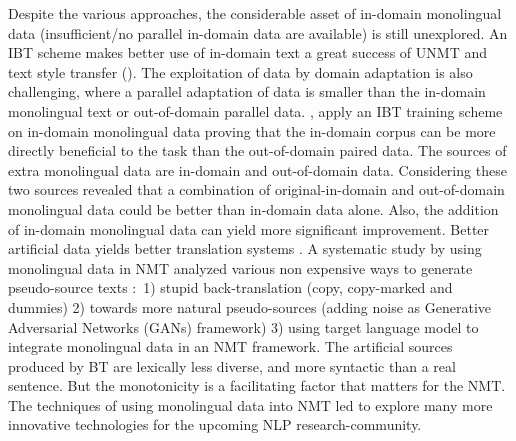\documentclass[manuscript,screen]{acmart}
\begin{document}
Despite the various approaches, the considerable asset of in-domain monolingual data (insufficient/no parallel in-domain data are available) is still unexplored. An IBT scheme makes better use of in-domain text a great success of UNMT and text style transfer (\citet{lample2018phrase,artetxe2017unsupervised,jin2019imat}). The exploitation of data by domain adaptation is also challenging, where a parallel adaptation of data is smaller than the in-domain monolingual text or out-of-domain parallel data. \citet{jin2020unsupervised}, apply an IBT training scheme on in-domain monolingual data proving that the in-domain corpus can be more directly beneficial to the task than the out-of-domain paired data. The sources of extra monolingual data are in-domain and out-of-domain data. Considering these two sources revealed that a combination of original-in-domain and out-of-domain monolingual data could be better than in-domain data alone. Also, the addition of in-domain monolingual data can yield more significant improvement. 
Better artificial data yields better translation systems \citet{burlot2019using}. A systematic study by \citet{burlot2019using} using monolingual data in NMT analyzed various non expensive ways to generate pseudo-source texts $\colon$ 1) stupid back-translation (copy, copy-marked and dummies) 2) towards more natural pseudo-sources (adding noise as Generative Adversarial Networks (GANs) framework) 3) using target language model to integrate monolingual data in an NMT framework. The artificial sources produced by BT are lexically less diverse, and more syntactic than a real sentence. But the monotonicity is a facilitating factor that matters for the NMT.
The techniques of using monolingual data into NMT led to explore many more innovative technologies for the upcoming NLP research-community.
\end{document}
